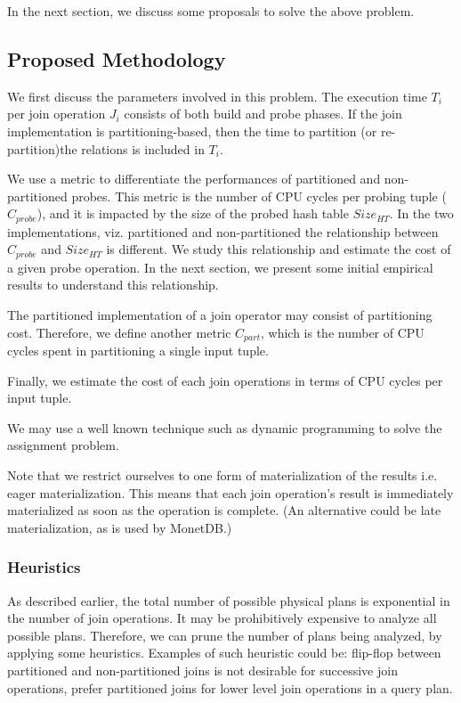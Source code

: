 In the next section, we discuss some proposals to solve the above problem. 

\subsection{Proposed Methodology}
We first discuss the parameters involved in this problem. 
The execution time $T_i$ per join operation $J_i$ consists of both build and probe phases.
If the join implementation is partitioning-based, then the time to partition (or re-partition)the relations is included in $T_i$.

We use a metric to differentiate the performances of partitioned and non-partitioned probes. 
This metric is the number of CPU cycles per probing tuple ($C_{probe}$), and it is impacted by the size of the probed hash table $Size_{HT}$. 
In the two implementations, viz. partitioned and non-partitioned the relationship between $C_{probe}$ and $Size_{HT}$ is different. 
We study this relationship and estimate the cost of a given probe operation. 
In the next section, we present some initial empirical results to understand this relationship.

The partitioned implementation of a join operator may consist of partitioning cost. 
Therefore, we define another metric $C_{part}$, which is the number of CPU cycles spent in partitioning a single input tuple. 

Finally, we estimate the cost of each join operations in terms of CPU cycles per input tuple. 

We may use a well known technique such as dynamic programming to solve the assignment problem. 

Note that we restrict ourselves to one form of materialization of the results i.e. eager materialization. 
This means that each join operation's result is immediately materialized as soon as the operation is complete. 
(An alternative could be late materialization, as is used by MonetDB.)

\subsubsection{Heuristics}
As described earlier, the total number of possible physical plans is exponential in the number of join operations. 
It may be prohibitively expensive to analyze all possible plans. 
Therefore, we can prune the number of plans being analyzed, by applying some heuristics.
Examples of such heuristic could be: flip-flop between partitioned and non-partitioned joins is not desirable for successive join operations, prefer partitioned joins for lower level join operations in a query plan. 